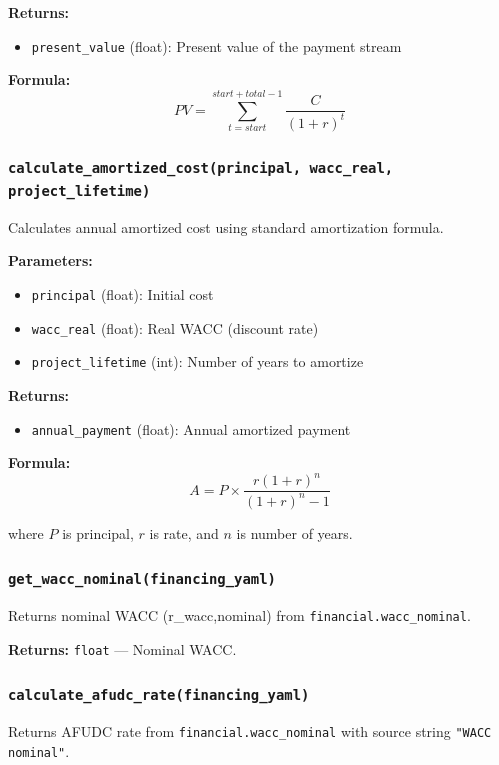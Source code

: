 \documentclass[ctcc_full_documentation.tex]{subfiles}
\begin{document}
\textbf{Returns:}
\begin{itemize}
    \item \texttt{present\_value} (float): Present value of the payment stream
\end{itemize}

\textbf{Formula:}
\[
PV = \sum_{t=start}^{start+total-1} \frac{C}{(1 + r)^t}
\]

\subsubsection{\texttt{calculate\_amortized\_cost(principal, wacc\_real, project\_lifetime)}}

Calculates annual amortized cost using standard amortization formula.

\textbf{Parameters:}
\begin{itemize}
    \item \texttt{principal} (float): Initial cost
    \item \texttt{wacc\_real} (float): Real WACC (discount rate)
    \item \texttt{project\_lifetime} (int): Number of years to amortize
\end{itemize}

\textbf{Returns:}
\begin{itemize}
    \item \texttt{annual\_payment} (float): Annual amortized payment
\end{itemize}

\textbf{Formula:}
\[
A = P \times \frac{r(1+r)^n}{(1+r)^n - 1}
\]

where $P$ is principal, $r$ is rate, and $n$ is number of years.

\subsubsection{\texttt{get\_wacc\_nominal(financing\_yaml)}}

Returns nominal WACC (r\_wacc,nominal) from \texttt{financial.wacc\_nominal}.

\textbf{Returns:} \texttt{float} --- Nominal WACC.

\subsubsection{\texttt{calculate\_afudc\_rate(financing\_yaml)}}

Returns AFUDC rate from \texttt{financial.wacc\_nominal} with source string \texttt{"WACC nominal"}.
\end{document}
